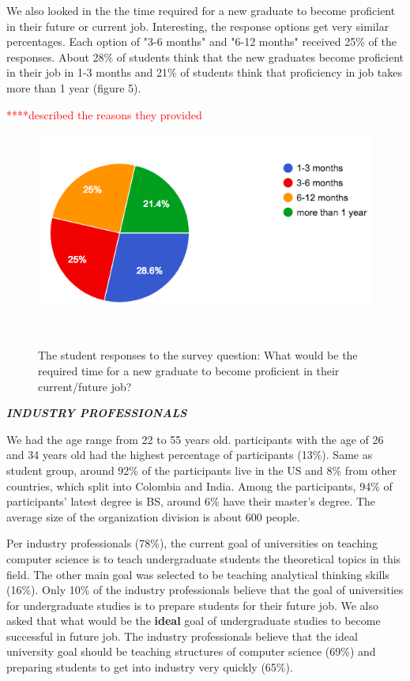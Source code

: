 \documentclass{sigchi}
\begin{document}
We also looked in the the time required for a new graduate to become proficient in their future or current job. Interesting, the response options get very similar percentages.  Each option of "3-6 months" and "6-12 months" received 25\% of the responses. About 28\% of students think that the new graduates become proficient in their job in 1-3 months and 21\% of students think that proficiency in job takes more than 1 year (figure 5).

\textcolor{red}{****described the reasons they provided}

\begin{figure}
\centering
  \includegraphics[width=1.05\columnwidth]{figures/time_proficiency_s}
  \caption{The student responses to the survey question: What would be the required time for a new graduate to become proficient in their current/future job? }~\label{fig:figure5}
\end{figure}


\textit{\textbf{INDUSTRY PROFESSIONALS}}

We had the age range from 22 to 55 years old. participants with the age of 26 and 34 years old had the highest percentage of participants (13\%).
Same as student group, around 92\% of the participants live in the US and 8\% from other countries, which split into Colombia and India. Among the participants, 94\% of participants' latest degree is BS, around 6\% have their master's degree. The average size of the organization division is about 600 people. 

Per industry professionals (78\%), the current goal of universities on teaching computer science is to teach undergraduate students the theoretical topics in this field. The other main goal was selected to be teaching analytical thinking skills (16\%). Only 10\% of the industry professionals believe that the goal of universities for undergraduate studies is to prepare students for their future job. 
We also asked that what would be the \textbf{ideal} goal of undergraduate studies to become successful in future job. The industry professionals believe that the ideal university goal should be teaching structures of computer science (69\%) and preparing students to get into industry very quickly (65\%).
\end{document}

